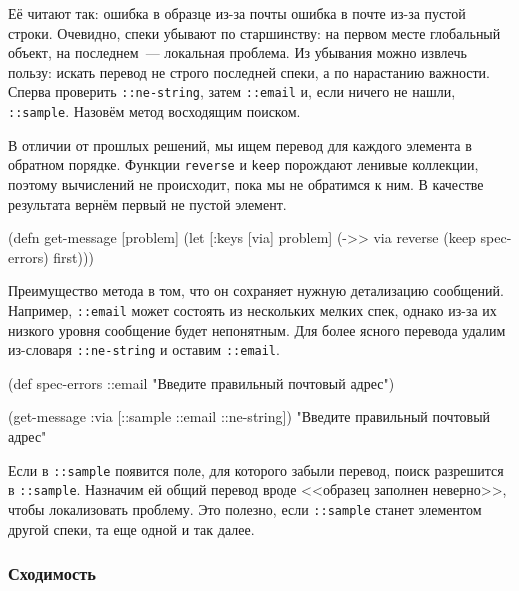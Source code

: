 Её читают так: ошибка в образце из-за почты \arr{} ошибка в почте из-за
пустой строки. Очевидно, спеки убывают по старшинству: на первом месте
глобальный объект, на последнем~--- локальная проблема. Из убывания можно
извлечь пользу: искать перевод не строго последней спеки, а по нарастанию
важности. Сперва проверить \verb|::ne-string|, затем \verb|::email| и, если
ничего не нашли, \verb|::sample|. Назовём метод восходящим поиском.


В отличии от прошлых решений, мы ищем перевод для каждого элемента в обратном
порядке. Функции \verb|reverse| и \verb|keep| порождают ленивые коллекции,
поэтому вычислений не происходит, пока мы не обратимся к ним. В качестве
результата вернём первый не пустой элемент.

\begin{english}
  \begin{clojure}
(defn get-message
  [problem]
  (let [{:keys [via]} problem]
    (->> via
         reverse
         (keep spec-errors)
         first)))
  \end{clojure}
\end{english}

Преимущество метода в том, что он сохраняет нужную детализацию
сообщений. Например, \verb|::email| может состоять из нескольких мелких спек,
однако из-за их низкого уровня сообщение будет непонятным. Для более ясного
перевода удалим из-словаря \verb|::ne-string| и оставим \verb|::email|.

  \begin{clojure}
(def spec-errors
  {::email "Введите правильный почтовый адрес"})

(get-message {:via [::sample ::email ::ne-string]})
"Введите правильный почтовый адрес"
  \end{clojure}

Если в \verb|::sample| появится поле, для которого забыли перевод, поиск
разрешится в \verb|::sample|. Назначим ей общий перевод вроде <<образец
заполнен неверно>>, чтобы локализовать проблему. Это полезно, если
\verb|::sample| станет элементом другой спеки, та еще одной и так далее.

\subsubsection{Сходимость}


